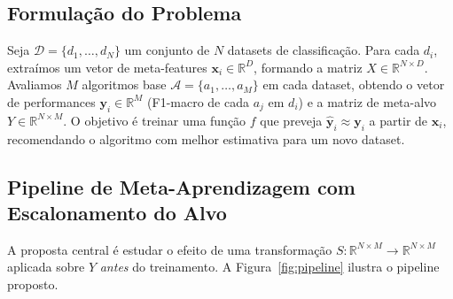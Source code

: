 \documentclass[12pt]{article}
\begin{document}
\subsection{Formulação do Problema}

Seja $\mathcal{D} = \{d_1, \dots, d_N\}$ um conjunto de $N$ datasets de classificação. Para cada $d_i$, extraímos um vetor de meta-features $\mathbf{x}_i \in \mathbb{R}^D$, formando a matriz $X \in \mathbb{R}^{N \times D}$. Avaliamos $M$ algoritmos base $\mathcal{A} = \{a_1, \dots, a_M\}$ em cada dataset, obtendo o vetor de performances $\mathbf{y}_i \in \mathbb{R}^M$ (F1-macro de cada $a_j$ em $d_i$) e a matriz de meta-alvo $Y \in \mathbb{R}^{N \times M}$. O objetivo é treinar uma função $f$ que preveja $\hat{\mathbf{y}}_i \approx \mathbf{y}_i$ a partir de $\mathbf{x}_i$, recomendando o algoritmo com melhor estimativa para um novo dataset.

\subsection{Pipeline de Meta-Aprendizagem com Escalonamento do Alvo}

A proposta central é estudar o efeito de uma transformação $S: \mathbb{R}^{N \times M} \rightarrow \mathbb{R}^{N \times M}$ aplicada sobre $Y$ \textit{antes} do treinamento. A Figura~\ref{fig:pipeline} ilustra o pipeline proposto.
\end{document}
